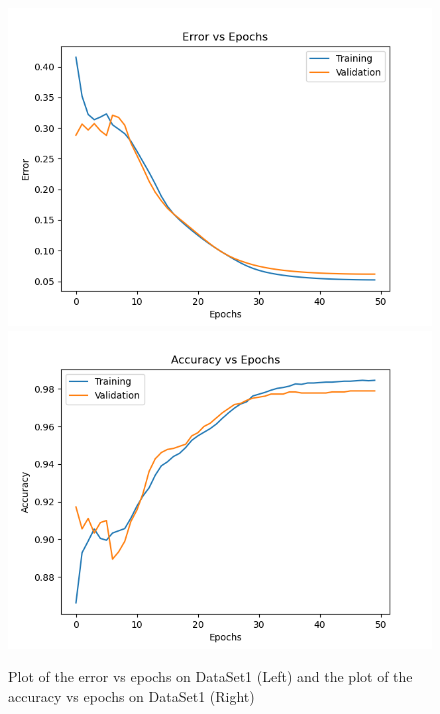 \documentclass[letterpaper, 12pt]{article}
\begin{document}
\begin{figure}[H]
\centering
\includegraphics[scale = 0.5]{DataSet1ErrorPlot}
\includegraphics[scale = 0.5]{DataSet1AccuracyPlot}
\caption{Plot of the error vs epochs on DataSet1 (Left) and the plot of the accuracy vs epochs on DataSet1 (Right)}
\end{figure}
\end{document}
